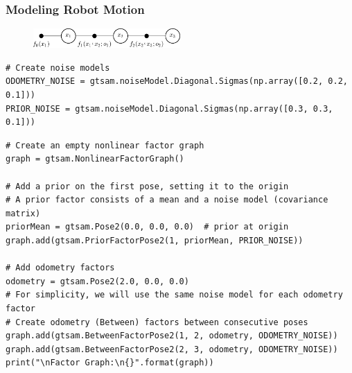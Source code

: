 \begin{frame}[fragile]
    \frametitle{Modeling Robot Motion}



    \scriptsize

    \begin{figure}[!h]
        \includegraphics[width=0.5\textwidth]{./images/gtsam/factor_graph_odometry.pdf}
    \end{figure}

\begin{lstlisting}[style=python] 
# Create noise models
ODOMETRY_NOISE = gtsam.noiseModel.Diagonal.Sigmas(np.array([0.2, 0.2, 0.1]))
PRIOR_NOISE = gtsam.noiseModel.Diagonal.Sigmas(np.array([0.3, 0.3, 0.1]))
\end{lstlisting}

\begin{lstlisting}[style=python] 
# Create an empty nonlinear factor graph
graph = gtsam.NonlinearFactorGraph()

# Add a prior on the first pose, setting it to the origin
# A prior factor consists of a mean and a noise model (covariance matrix)
priorMean = gtsam.Pose2(0.0, 0.0, 0.0)  # prior at origin
graph.add(gtsam.PriorFactorPose2(1, priorMean, PRIOR_NOISE))

# Add odometry factors
odometry = gtsam.Pose2(2.0, 0.0, 0.0)
# For simplicity, we will use the same noise model for each odometry factor
# Create odometry (Between) factors between consecutive poses
graph.add(gtsam.BetweenFactorPose2(1, 2, odometry, ODOMETRY_NOISE))
graph.add(gtsam.BetweenFactorPose2(2, 3, odometry, ODOMETRY_NOISE))
print("\nFactor Graph:\n{}".format(graph))
\end{lstlisting}

\end{frame}

